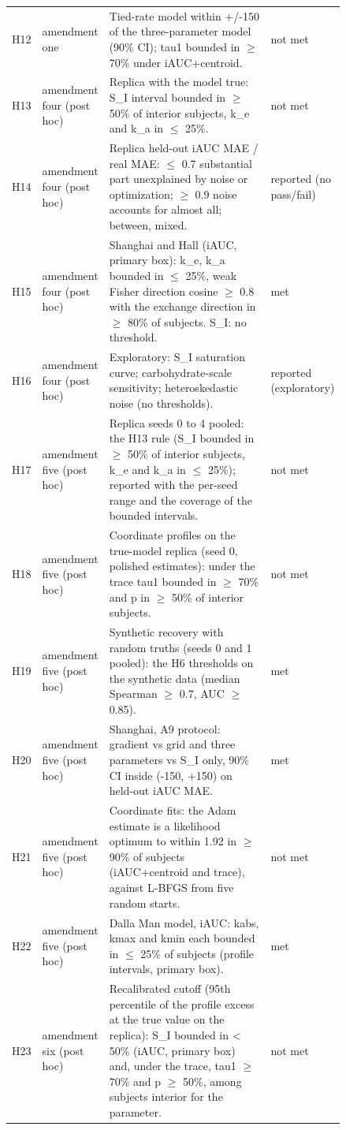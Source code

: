 {\begin{longtable}{lp{0.16\linewidth}p{0.52\linewidth}p{0.16\linewidth}}
H12 & amendment one & Tied-rate model within +/-150 of the three-parameter model (90\% CI); tau1 bounded in $\ge$ 70\% under iAUC+centroid. & not met \\
H13 & amendment four (post hoc) & Replica with the model true: S\_I interval bounded in $\ge$ 50\% of interior subjects, k\_e and k\_a in $\le$ 25\%. & not met \\
H14 & amendment four (post hoc) & Replica held-out iAUC MAE / real MAE: $\le$ 0.7 substantial part unexplained by noise or optimization; $\ge$ 0.9 noise accounts for almost all; between, mixed. & reported (no pass/fail) \\
H15 & amendment four (post hoc) & Shanghai and Hall (iAUC, primary box): k\_e, k\_a bounded in $\le$ 25\%, weak Fisher direction cosine $\ge$ 0.8 with the exchange direction in $\ge$ 80\% of subjects. S\_I: no threshold. & met \\
H16 & amendment four (post hoc) & Exploratory: S\_I saturation curve; carbohydrate-scale sensitivity; heteroskedastic noise (no thresholds). & reported (exploratory) \\
H17 & amendment five (post hoc) & Replica seeds 0 to 4 pooled: the H13 rule (S\_I bounded in $\ge$ 50\% of interior subjects, k\_e and k\_a in $\le$ 25\%); reported with the per-seed range and the coverage of the bounded intervals. & not met \\
H18 & amendment five (post hoc) & Coordinate profiles on the true-model replica (seed 0, polished estimates): under the trace tau1 bounded in $\ge$ 70\% and p in $\ge$ 50\% of interior subjects. & not met \\
H19 & amendment five (post hoc) & Synthetic recovery with random truths (seeds 0 and 1 pooled): the H6 thresholds on the synthetic data (median Spearman $\ge$ 0.7, AUC $\ge$ 0.85). & met \\
H20 & amendment five (post hoc) & Shanghai, A9 protocol: gradient vs grid and three parameters vs S\_I only, 90\% CI inside (-150, +150) on held-out iAUC MAE. & met \\
H21 & amendment five (post hoc) & Coordinate fits: the Adam estimate is a likelihood optimum to within 1.92 in $\ge$ 90\% of subjects (iAUC+centroid and trace), against L-BFGS from five random starts. & not met \\
H22 & amendment five (post hoc) & Dalla Man model, iAUC: kabs, kmax and kmin each bounded in $\le$ 25\% of subjects (profile intervals, primary box). & met \\
H23 & amendment six (post hoc) & Recalibrated cutoff (95th percentile of the profile excess at the true value on the replica): S\_I bounded in < 50\% (iAUC, primary box) and, under the trace, tau1 $\ge$ 70\% and p $\ge$ 50\%, among subjects interior for the parameter. & not met \\

\end{longtable}}
